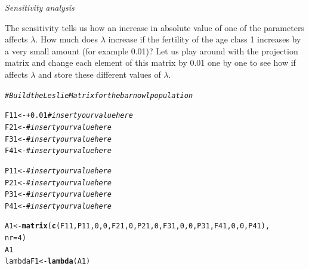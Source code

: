 \documentclass{article}\usepackage[]{graphicx}\usepackage[]{color}
\makeatletter
\newcommand{\hlnum}[1]{\textcolor[rgb]{0.686,0.059,0.569}{#1}}%
\newcommand{\hlcom}[1]{\textcolor[rgb]{0.678,0.584,0.686}{\textit{#1}}}%
\newcommand{\hlopt}[1]{\textcolor[rgb]{0,0,0}{#1}}%
\newcommand{\hlstd}[1]{\textcolor[rgb]{0.345,0.345,0.345}{#1}}%
\newcommand{\hlkwb}[1]{\textcolor[rgb]{0.69,0.353,0.396}{#1}}%
\newcommand{\hlkwc}[1]{\textcolor[rgb]{0.333,0.667,0.333}{#1}}%
\newcommand{\hlkwd}[1]{\textcolor[rgb]{0.737,0.353,0.396}{\textbf{#1}}}%
\newenvironment{kframe}{%
 \def\at@end@of@kframe{}%
 \ifinner\ifhmode%
  \def\at@end@of@kframe{\end{minipage}}%
  \begin{minipage}{\columnwidth}%
 \fi\fi%
 \def\FrameCommand##1{\hskip\@totalleftmargin \hskip-\fboxsep
 \colorbox{shadecolor}{##1}\hskip-\fboxsep
     \hskip-\linewidth \hskip-\@totalleftmargin \hskip\columnwidth}%
 \MakeFramed {\advance\hsize-\width
   \@totalleftmargin\z@ \linewidth\hsize
   \@setminipage}}%
 {\par\unskip\endMakeFramed%
 \at@end@of@kframe}
\newenvironment{knitrout}{}{} %
\makeatother
\begin{document}
\vspace{1.5ex}
\noindent\textit{Sensitivity analysis}


The sensitivity tells us how an increase in absolute value of one of the parameters affects $\lambda$. How much does $\lambda$ increase if the fertility of the age class 1 increases by a very small amount (for example 0.01)? Let us play around with the projection matrix and change each element of this matrix by 0.01 one by one to see how if affects $\lambda$ and store these different values of $\lambda$. 
\begin{knitrout}
\color{fgcolor}\begin{kframe}
\begin{alltt}
\hlcom{# Build the Leslie Matrix for the barn owl population}

\hlstd{F11}\hlkwb{<-}    \hlopt{+} \hlnum{0.01} \hlcom{#insert your value here}
\hlstd{F21}\hlkwb{<-} \hlcom{#insert your value here}
\hlstd{F31}\hlkwb{<-} \hlcom{#insert your value here}
\hlstd{F41}\hlkwb{<-} \hlcom{#insert your value here}

\hlstd{P11}\hlkwb{<-} \hlcom{#insert your value here}
\hlstd{P21}\hlkwb{<-} \hlcom{#insert your value here}
\hlstd{P31}\hlkwb{<-} \hlcom{#insert your value here}
\hlstd{P41}\hlkwb{<-} \hlcom{#insert your value here }

\hlstd{A1}\hlkwb{<-}\hlkwd{matrix}\hlstd{(}\hlkwd{c}\hlstd{(F11,P11,}\hlnum{0}\hlstd{,}\hlnum{0}\hlstd{,F21,}\hlnum{0}\hlstd{,P21,}\hlnum{0}\hlstd{,F31,}\hlnum{0}\hlstd{,}\hlnum{0}\hlstd{,P31,F41,}\hlnum{0}\hlstd{,}\hlnum{0}\hlstd{,P41),}
           \hlkwc{nr}\hlstd{=}\hlnum{4}\hlstd{)}
\hlstd{A1}
\hlstd{lambdaF1}\hlkwb{<-} \hlkwd{lambda}\hlstd{(A1)}
\end{alltt}
\end{kframe}
\end{knitrout}
\end{document}
